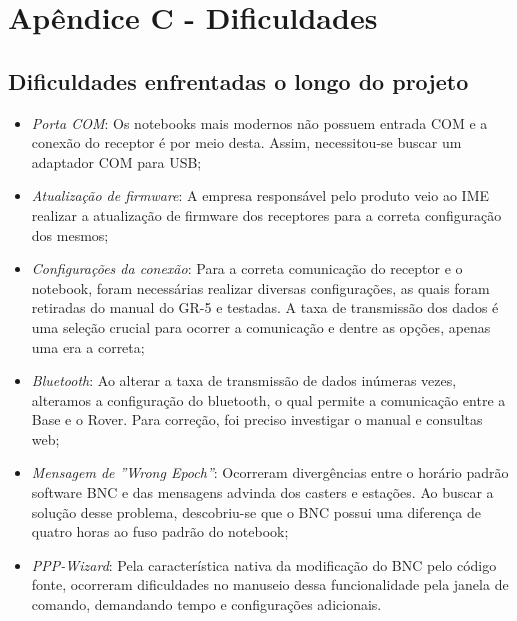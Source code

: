 \chapter{Apêndice C - Dificuldades}
\noindent

\section{Dificuldades enfrentadas o longo do projeto}

\begin{itemize}
    \item \textit{Porta COM}: Os notebooks mais modernos não possuem entrada COM e a conexão do receptor é por meio desta. Assim, necessitou-se buscar um adaptador COM para USB;
    \item \textit{Atualização de firmware}: A empresa responsável pelo produto veio ao IME realizar a atualização de firmware dos receptores para a correta configuração dos mesmos;
    \item \textit{Configurações da conexão}: Para a correta comunicação do receptor e o notebook, foram necessárias realizar diversas configurações, as quais foram retiradas do manual do GR-5 e testadas. A taxa de transmissão dos dados é uma seleção crucial para ocorrer a comunicação e dentre as opções, apenas uma era a correta;
    \item \textit{Bluetooth}: Ao alterar a taxa de transmissão de dados inúmeras vezes, alteramos a configuração do bluetooth, o qual permite a comunicação entre a Base e o Rover. Para correção, foi preciso investigar o manual e consultas web;
    \item \textit{Mensagem de ''Wrong Epoch''}: Ocorreram divergências entre o horário padrão software BNC e das mensagens advinda dos casters e estações. Ao buscar a solução desse problema, descobriu-se que o BNC possui uma diferença de quatro horas ao fuso padrão do notebook;
    \item \textit{PPP-Wizard}: Pela característica nativa da modificação do BNC pelo código fonte, ocorreram dificuldades no manuseio dessa funcionalidade pela janela de comando, demandando tempo e configurações adicionais.
    
    

\end{itemize}